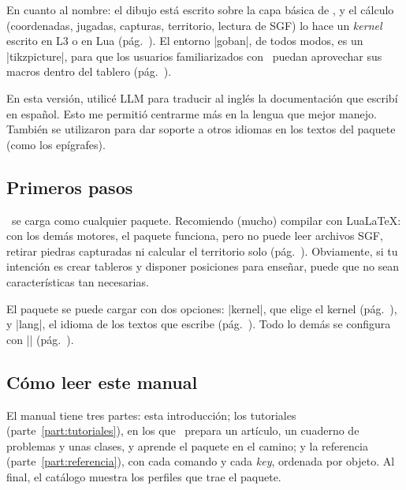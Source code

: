 En cuanto al nombre: el dibujo está escrito sobre la capa básica de \pgfname, y el cálculo (coordenadas, jugadas, capturas, territorio, lectura de SGF) lo hace un \emph{kernel} escrito en L3 o en Lua (pág.~\pageref{subsec:kernel}). El entorno |goban|, de todos modos, es un |tikzpicture|, para que los usuarios familiarizados con \tikzname\ puedan aprovechar sus macros dentro del tablero (pág.~\pageref{sec:tablero}).

En esta versión, utilicé LLM para traducir al inglés la documentación que escribí en español. Esto me permitió centrarme más en la lengua que mejor manejo. También se utilizaron para dar soporte a otros idiomas en los textos del paquete (como los epígrafes).

\subsection{Primeros pasos}
\label{subsec:primerospasos}

\pgfgoname\ se carga como cualquier paquete. Recomiendo (mucho) compilar con Lua\LaTeX: con los demás motores, el paquete funciona, pero no puede leer archivos SGF, retirar piedras capturadas ni calcular el territorio solo (pág.~\pageref{subsec:kernel}). Obviamente, si tu intenci\'on es crear tableros y disponer posiciones para ense\~nar, puede que no sean caracter\'isticas tan necesarias.


El paquete se puede cargar con dos opciones: |kernel|, que elige el kernel (pág.~\pageref{subsec:kernel}), y |lang|, el idioma de los textos que escribe (pág.~\pageref{subsec:idiomas}). Todo lo demás se configura con |\pgfgoset| (pág.~\pageref{sec:configuracion}).

\subsection{Cómo leer este manual}
\label{subsec:guia}

El manual tiene tres partes: esta introducción; los tutoriales (parte~\ref{part:tutoriales}), en los que \karu\ prepara un artículo, un cuaderno de problemas y unas clases, y aprende el paquete en el camino; y la referencia (parte~\ref{part:referencia}), con cada comando y cada \emph{key}, ordenada por objeto. Al final, el catálogo muestra los perfiles que trae el paquete.

